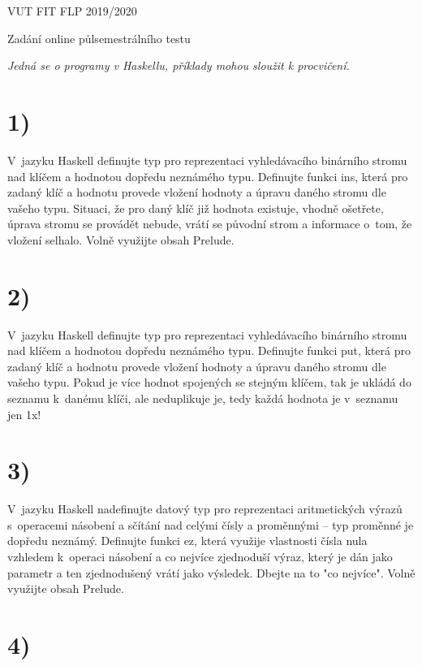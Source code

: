 \documentclass[11pt, a4paper, titlepage]{article}
\begin{document}
\begin{center}
    \Large VUT FIT FLP 2019/2020
    \bigskip

    \Large Zadání online půlsemestrálního testu
    \bigskip

    \large \textit{Jedná se o programy v Haskellu, příklady mohou sloužit k procvičení.}
\end{center}

\section*{1)}

V~jazyku Haskell definujte typ pro reprezentaci vyhledávacího binárního stromu nad klíčem a hodnotou dopředu neznámého typu. Definujte funkci ins, která pro zadaný klíč a hodnotu provede vložení hodnoty a úpravu daného stromu dle vašeho typu. Situaci, že pro daný klíč již hodnota existuje, vhodně ošetřete, úprava stromu se provádět nebude, vrátí se původní strom a informace o~tom, že vložení selhalo. Volně využijte obsah Prelude.

\section*{2)}

V~jazyku Haskell definujte typ pro reprezentaci vyhledávacího binárního stromu nad klíčem a hodnotou dopředu neznámého typu. Definujte funkci put, která pro zadaný klíč a hodnotu provede vložení hodnoty a úpravu daného stromu dle vašeho typu. Pokud je více hodnot spojených se stejným klíčem, tak je ukládá do seznamu k~danému klíči, ale neduplikuje je, tedy každá hodnota je v~seznamu jen 1x!

\section*{3)}

V~jazyku Haskell nadefinujte datový typ pro reprezentaci aritmetických výrazů s~operacemi násobení a sčítání nad celými čísly a proměnnými -- typ proměnné je dopředu neznámý. Definujte funkci ez, která využije vlastnosti čísla nula vzhledem k~operaci násobení a co nejvíce zjednoduší výraz, který je dán jako parametr a ten zjednodušený vrátí jako výsledek. Dbejte na to "co nejvíce". Volně využijte obsah Prelude.

\section*{4)}
\end{document}
